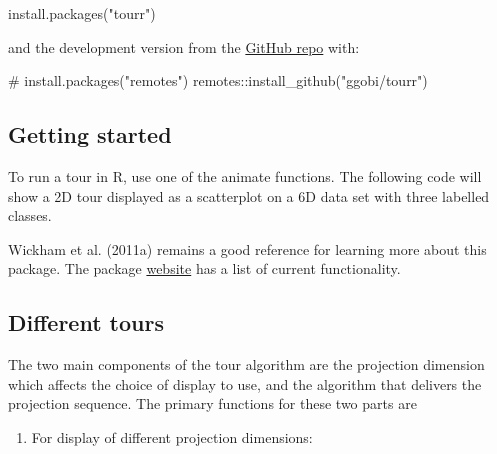 \documentclass[
  letterpaper,
]{krantz}
\newenvironment{Shaded}{\begin{snugshade}}{\end{snugshade}}
\newcommand{\AttributeTok}[1]{\textcolor[rgb]{0.40,0.45,0.13}{#1}}
\newcommand{\CommentTok}[1]{\textcolor[rgb]{0.37,0.37,0.37}{#1}}
\newcommand{\DecValTok}[1]{\textcolor[rgb]{0.68,0.00,0.00}{#1}}
\newcommand{\FunctionTok}[1]{\textcolor[rgb]{0.28,0.35,0.67}{#1}}
\newcommand{\NormalTok}[1]{\textcolor[rgb]{0.00,0.23,0.31}{#1}}
\newcommand{\SpecialCharTok}[1]{\textcolor[rgb]{0.37,0.37,0.37}{#1}}
\newcommand{\StringTok}[1]{\textcolor[rgb]{0.13,0.47,0.30}{#1}}
\providecommand{\tightlist}{%
  \setlength{\itemsep}{0pt}\setlength{\parskip}{0pt}}\usepackage{longtable,booktabs,array}
\begin{document}
\begin{Shaded}
\begin{Highlighting}[]
\FunctionTok{install.packages}\NormalTok{(}\StringTok{"tourr"}\NormalTok{)}
\end{Highlighting}
\end{Shaded}

and the development version from the
\href{https://github.com/ggobi/tourr}{GitHub repo} with:

\begin{Shaded}
\begin{Highlighting}[]
\CommentTok{\# install.packages("remotes")}
\NormalTok{remotes}\SpecialCharTok{::}\FunctionTok{install\_github}\NormalTok{(}\StringTok{"ggobi/tourr"}\NormalTok{)}
\end{Highlighting}
\end{Shaded}

\subsection{Getting started}\label{getting-started}

To run a tour in R, use one of the animate functions. The following code
will show a 2D tour displayed as a scatterplot on a 6D data set with
three labelled classes.

\begin{Shaded}
\end{Shaded}

Wickham et al. (2011a) remains a good reference for learning more about
this package. The package \href{http://ggobi.github.io/tourr/}{website}
has a list of current functionality.

\subsection{Different tours}\label{different-tours}

The two main components of the tour algorithm are the projection
dimension which affects the choice of display to use, and the algorithm
that delivers the projection sequence. The primary functions for these
two parts are

\begin{enumerate}
\def\labelenumi{\arabic{enumi}.}
\tightlist
\item
  For display of different projection dimensions:
\end{enumerate}
\end{document}
